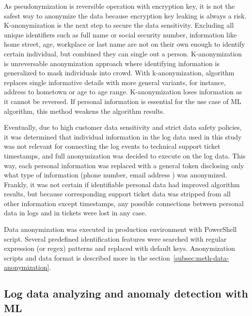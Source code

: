 As pseudonymization is reversible operation with encryption key,
it is not the safest way to anonymize the data
because encryption key leaking is always a risk.
K-anonymization is the next step to secure the data sensitivity.
Excluding all unique identifiers such as full name or social security number,
information like home street, age, workplace or last name
are not on their own enough to identify certain individual,
but combined they can single out a person.
K-anonymization is unreversable anonymization approach
where identifying information is generalized
to mask individuals into crowd.
With k-anonymization,
algorithm replaces single informative details
with more general variants,
for instance,
address to hometown or age to age range.
K-anonymization loses information
as it cannot be reversed.
If personal information is essential for the use case of ML algorithm,
this method weakens the algorithm results.~\cite{byun2007efficient}

Eventually,
due to high customer data sensitivity and strict data safety policies,
it was determined that individual information in the log data used in this study
was not relevant for connecting the log events to technical support ticket timestamps,
and full anonymization was decided to execute on the log data.
This way,
each personal information was replaced with a general token
disclosing only what type of information (phone number, email address \etc) was anonymized.
Frankly,
it was not certain if identifiable personal data had improved algorithm results,
but because corresponding support ticket data
was stripped from all other information except timestamps,
any possible connections between personal data in logs and in tickets
were lost in any case.

Data anonymization was executed in production environment
with PowerShell script.
Several predefined identification features were searched with
regular expression (or regex) patterns and replaced with
default keys.
Anonymization scripts and data format
is described more in the section~\ref{subsec:meth-data-anonymization}.



\subsection{Log data analyzing and anomaly detection with ML}\label{subsec:bg-log-data-analyzing-and-anomaly-detection-with-ml}

